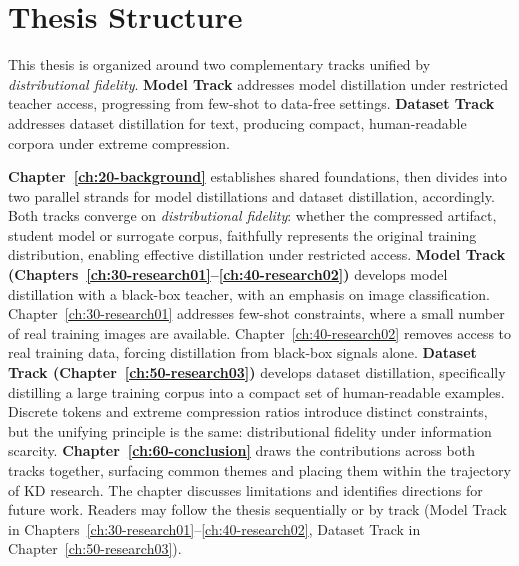 \section{Thesis Structure} \label{sec:16-introduction-structure}
\begin{foldable}
  This thesis is organized around two complementary tracks unified by \textit{distributional fidelity}.
  \textbf{Model Track} addresses model distillation under restricted teacher access, progressing from few-shot to data-free settings.
  \textbf{Dataset Track} addresses dataset distillation for text, producing compact, human-readable corpora under extreme compression.
\end{foldable}

\begin{foldable}
  \textbf{Chapter~\ref{ch:20-background}} establishes shared foundations, then divides into two parallel strands for model distillations and dataset distillation, accordingly.
  Both tracks converge on \textit{distributional fidelity}: whether the compressed artifact, student model or surrogate corpus, faithfully represents the original training distribution, enabling effective distillation under restricted access.
  \textbf{Model Track (Chapters~\ref{ch:30-research01}--\ref{ch:40-research02})} develops model distillation with a black-box teacher, with an emphasis on image classification.
  Chapter~\ref{ch:30-research01} addresses few-shot constraints, where a small number of real training images are available.
  Chapter~\ref{ch:40-research02} removes access to real training data, forcing distillation from black-box signals alone.
  \textbf{Dataset Track (Chapter~\ref{ch:50-research03})} develops dataset distillation, specifically distilling a large training corpus into a compact set of human-readable examples.
  Discrete tokens and extreme compression ratios introduce distinct constraints, but the unifying principle is the same: distributional fidelity under information scarcity.
  \textbf{Chapter~\ref{ch:60-conclusion}} draws the contributions across both tracks together, surfacing common themes and placing them within the trajectory of \ac{KD} research.
  The chapter discusses limitations and identifies directions for future work.
  Readers may follow the thesis sequentially or by track (Model Track in Chapters~\ref{ch:30-research01}--\ref{ch:40-research02}, Dataset Track in Chapter~\ref{ch:50-research03}).
\end{foldable}
